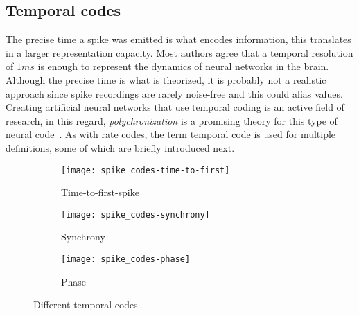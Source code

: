 \subsection{Temporal codes}
The precise time a spike was emitted is what encodes information, this translates in a larger representation capacity. Most authors agree that a temporal resolution of $1ms$ is enough to represent the dynamics of neural networks in the brain. Although the precise time is what is theorized, it is probably not a realistic approach since spike recordings are rarely noise-free and this could alias values. Creating artificial neural networks that use temporal coding is an active field of research, in this regard, \emph{polychronization} is a promising theory for this type of neural code~\cite{polychronization-Izhikevich2005}. As with rate codes, the term temporal code is used for multiple definitions, some of which are briefly introduced next.


\begin{figure}[h]
  \begin{center}
    \begin{subfigure}{0.25\textwidth}
      \centering
      \captionsetup{justification=centering}
      \texttt{[image: spike\_codes-time-to-first]}
      \caption{Time-to-first-spike}
      \label{fig:neuro:time-to-first}
    \end{subfigure}
    \begin{subfigure}{0.25\textwidth}
      \centering
      \captionsetup{justification=centering}
      \texttt{[image: spike\_codes-synchrony]}
      \caption{Synchrony}
      \label{fig:neuro:synchrony}
    \end{subfigure}
    \begin{subfigure}{0.265\textwidth}
      \centering
      \captionsetup{justification=centering}
      \texttt{[image: spike\_codes-phase]}
      \caption{Phase}
      \label{fig:neuro:phase}
    \end{subfigure}
    \caption{Different temporal codes}
    \label{fig:neuro:temporal-codes}
  \end{center}
\end{figure}



